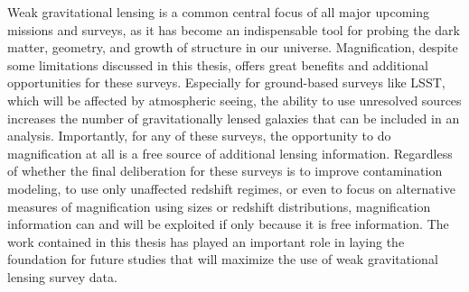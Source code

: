 Weak gravitational lensing is a common central focus of all major upcoming missions and surveys, as it has become an indispensable tool for probing the dark matter, geometry, and growth of structure in our universe. Magnification, despite some limitations discussed in this thesis, offers great benefits and additional opportunities for these surveys. Especially for ground-based surveys like \ac{LSST}, which will be affected by atmospheric seeing, the ability to use unresolved sources increases the number of gravitationally lensed galaxies that can be included in an analysis. Importantly, for any of these surveys, the opportunity to do magnification at all is a free source of additional lensing information. Regardless of whether the final deliberation for these surveys is to improve contamination modeling, to use only unaffected redshift regimes, or even to focus on alternative measures of magnification using sizes or redshift distributions, magnification information can and will be exploited if only because it is free information. The work contained in this thesis has played an important role in laying the foundation for future studies that will maximize the use of weak gravitational lensing survey data.


\endinput
Any text after an \endinput is ignored.
You could put scraps here or things in progress.
